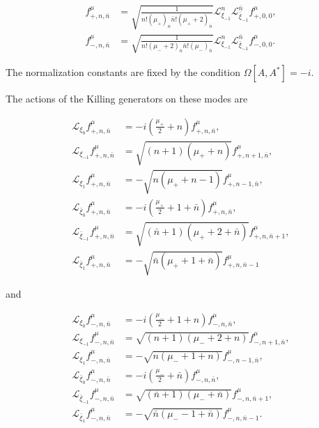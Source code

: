  \begin{align}
f^{\mu}_{+,n,\bar{n}} & =\sqrt{ \frac{1}{n!(\mu _{+})_{n}\bar{n}!(\mu _{+}+2)_{\bar{n}}} }\mathcal{L}_{\xi _{-1}}^{n}\mathcal{L}_{\bar{\xi}_{-1}}^{\bar{n}}f_{+,0,0}^{\mu}, \\
f^{\mu}_{-,n,\bar{n}} & =\sqrt{ \frac{1}{n!(\mu _{-}+2)_{n}\bar{n}!(\mu _{-})_{\bar{n}}} } \mathcal{L}_{\xi _{-1}}^{n}\mathcal{L}_{\bar{\xi}_{-1}}^{\bar{n}}f_{-,0,0}^{\mu}.
\end{align}

The normalization constants are fixed by the condition $\Omega[A,A^*] = -i$.

The actions of the Killing generators on these modes are

 \begin{align}
\mathcal{L}_{\xi_{0}}f_{+,n,\bar{n}}^{\mu} & =-i\left(\frac{\mu _{+}}{2}+n\right)f_{+,n,\bar{n}}^{\mu}, \\
\mathcal{L}_{\xi _{-1}}f_{+,n,\bar{n}}^{\mu} & =\sqrt{ (n+1)(\mu _{+}+n) }f_{+,n+1,\bar{n}}^{\mu}, \\
\mathcal{L}_{\xi _{1}}f_{+,n,\bar{n}}^{\mu} & =-\sqrt{ n(\mu _{+}+n-1) }f_{+,n-1,\bar{n}}^{\mu}, \\
\mathcal{L}_{\bar{\xi}_{0}}f_{+,n,\bar{n}}^{\mu} & =-i\left(\frac{\mu _{+}}{2}+1+\bar{n}\right)f_{+,n,\bar{n}}^{\mu}, \\
\mathcal{L}_{\bar{\xi}_{-1}}f_{+,n,\bar{n}}^{\mu} & =\sqrt{ (\bar{n}+1)(\mu _{+}+2+\bar{n}) }f_{+,n,\bar{n}+1}^{\mu}, \\
\mathcal{L}_{\bar{\xi}_{1}}f_{+,n,\bar{n}}^{\mu} & =-\sqrt{ \bar{n}(\mu _{+}+1+\bar{n}) }f_{+,n,\bar{n}-1}^{\mu}
\end{align}

and

 \begin{align}
\mathcal{L}_{\xi_{0}}f_{-,n,\bar{n}}^{\mu} & =-i\left(\frac{\mu _{-}}{2}+1+n\right)f_{-,n,\bar{n}}^{\mu}, \\
\mathcal{L}_{\xi _{-1}}f_{-,n,\bar{n}}^{\mu} & =\sqrt{ (n+1)(\mu _{-}+2+n) }f_{-,n+1,\bar{n}}^{\mu}, \\
\mathcal{L}_{\xi _{1}}f_{-,n,\bar{n}}^{\mu} & =-\sqrt{ n(\mu _{-}+1+n) }f_{-,n-1,\bar{n}}^{\mu}, \\
\mathcal{L}_{\bar{\xi}_{0}}f_{-,n,\bar{n}}^{\mu} & =-i\left(\frac{\mu _{-}}{2}+\bar{n}\right)f_{-,n,\bar{n}}^{\mu}, \\
\mathcal{L}_{\bar{\xi}_{-1}}f_{-,n,\bar{n}}^{\mu} & =\sqrt{ (\bar{n}+1)(\mu _{-}+\bar{n}) }f_{-,n,\bar{n}+1}^{\mu}, \\
\mathcal{L}_{\bar{\xi}_{1}}f_{-,n,\bar{n}}^{\mu} & =-\sqrt{ \bar{n}(\mu _{-}-1+\bar{n}) }f_{-,n,\bar{n}-1}^{\mu}.
\end{align}

